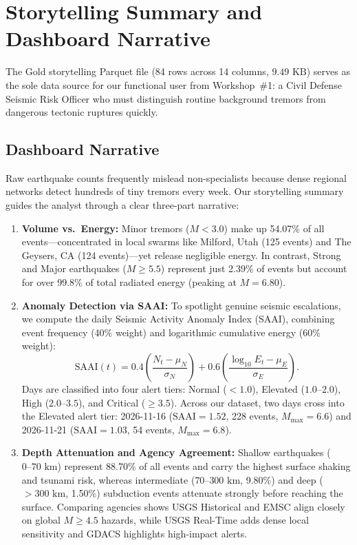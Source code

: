\section{Storytelling Summary and Dashboard Narrative}
\label{sec:storytelling}

The Gold storytelling Parquet file (84 rows across 14 columns, $9.49\text{ KB}$) serves as the sole data source for our functional user from Workshop~\#1: a Civil Defense Seismic Risk Officer who must distinguish routine background tremors from dangerous tectonic ruptures quickly.

\subsection{Dashboard Narrative}
Raw earthquake counts frequently mislead non-specialists because dense regional networks detect hundreds of tiny tremors every week. Our storytelling summary guides the analyst through a clear three-part narrative:
\begin{enumerate}
    \item \textbf{Volume vs.\ Energy:} Minor tremors ($M < 3.0$) make up 54.07\% of all events---concentrated in local swarms like Milford, Utah (125 events) and The Geysers, CA (124 events)---yet release negligible energy. In contrast, Strong and Major earthquakes ($M \ge 5.5$) represent just 2.39\% of events but account for over 99.8\% of total radiated energy (peaking at $M = 6.80$).
    \item \textbf{Anomaly Detection via SAAI:} To spotlight genuine seismic escalations, we compute the daily Seismic Activity Anomaly Index (SAAI), combining event frequency (40\% weight) and logarithmic cumulative energy (60\% weight):
    \begin{equation}
        \text{SAAI}(t) = 0.4 \left(\frac{N_t - \mu_N}{\sigma_N}\right) + 0.6 \left(\frac{\log_{10} E_t - \mu_E}{\sigma_E}\right).
        \label{eq:saai}
    \end{equation}
    Days are classified into four alert tiers: Normal ($<1.0$), Elevated ($1.0\text{--}2.0$), High ($2.0\text{--}3.5$), and Critical ($\ge 3.5$). Across our dataset, two days cross into the Elevated alert tier: 2026-11-16 ($\text{SAAI} = 1.52$, 228 events, $M_{\max} = 6.6$) and 2026-11-21 ($\text{SAAI} = 1.03$, 54 events, $M_{\max} = 6.8$).
    \item \textbf{Depth Attenuation and Agency Agreement:} Shallow earthquakes ($0\text{--}70\text{ km}$) represent 88.70\% of all events and carry the highest surface shaking and tsunami risk, whereas intermediate ($70\text{--}300\text{ km}$, 9.80\%) and deep ($>300\text{ km}$, 1.50\%) subduction events attenuate strongly before reaching the surface. Comparing agencies shows USGS Historical and EMSC align closely on global $M \ge 4.5$ hazards, while USGS Real-Time adds dense local sensitivity and GDACS highlights high-impact alerts.
\end{enumerate}

